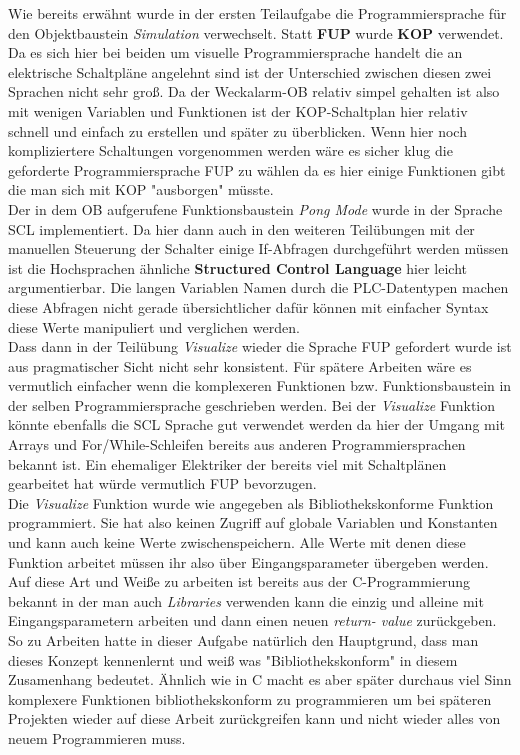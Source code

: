 \documentclass[a4paper]{article}
\begin{document}
    Wie bereits erwähnt wurde in der ersten Teilaufgabe die Programmiersprache für den Objektbaustein \textit{Simulation} verwechselt. Statt \textbf{FUP} wurde \textbf{KOP} verwendet. Da es sich hier bei beiden um visuelle Programmiersprache handelt die an elektrische Schaltpläne angelehnt sind ist der Unterschied zwischen diesen zwei Sprachen nicht sehr groß. Da der Weckalarm-OB relativ simpel gehalten ist also mit wenigen Variablen und Funktionen ist der KOP-Schaltplan hier relativ schnell und einfach zu erstellen und später zu überblicken. Wenn hier noch kompliziertere Schaltungen vorgenommen werden wäre es sicher klug die geforderte Programmiersprache FUP zu wählen da es hier einige Funktionen gibt die man sich mit KOP "ausborgen" müsste. \\ 
    Der in dem OB aufgerufene Funktionsbaustein \textit{Pong Mode} wurde in der Sprache SCL implementiert. Da hier dann auch in den weiteren Teilübungen mit der manuellen Steuerung der Schalter einige If-Abfragen durchgeführt werden müssen ist die Hochsprachen ähnliche \textbf{Structured Control Language} hier leicht argumentierbar. Die langen Variablen Namen durch die PLC-Datentypen machen diese Abfragen nicht gerade übersichtlicher dafür können mit einfacher Syntax diese Werte manipuliert und verglichen werden. \\ Dass dann in der Teilübung \textit{Visualize} wieder die Sprache FUP gefordert wurde ist aus pragmatischer Sicht nicht sehr konsistent. Für spätere Arbeiten wäre es vermutlich einfacher wenn die komplexeren Funktionen bzw. Funktionsbaustein in der selben Programmiersprache geschrieben werden. Bei der \textit{Visualize} Funktion könnte ebenfalls die SCL Sprache gut verwendet werden da hier der Umgang mit Arrays und For/While-Schleifen bereits aus anderen Programmiersprachen bekannt ist. Ein ehemaliger Elektriker der bereits viel mit Schaltplänen gearbeitet hat würde vermutlich  FUP bevorzugen. \\
    Die \textit{Visualize} Funktion wurde wie angegeben als Bibliothekskonforme Funktion programmiert. Sie hat also keinen Zugriff auf globale Variablen und Konstanten und kann auch keine Werte zwischenspeichern. Alle Werte mit denen diese Funktion arbeitet müssen ihr also über Eingangsparameter übergeben werden. Auf diese Art und Weiße zu arbeiten ist bereits aus der C-Programmierung bekannt in der man auch \textit{Libraries} verwenden kann die einzig und alleine mit Eingangsparametern arbeiten und dann einen neuen \textit{return-  value} zurückgeben. So zu Arbeiten hatte in dieser Aufgabe natürlich den Hauptgrund, dass man dieses Konzept kennenlernt und weiß was "Bibliothekskonform" in diesem Zusamenhang bedeutet. Ähnlich wie in C macht es aber später durchaus viel Sinn komplexere Funktionen bibliothekskonform zu programmieren um bei späteren Projekten wieder auf diese Arbeit zurückgreifen kann und nicht wieder alles von neuem Programmieren muss. \\
\end{document}
